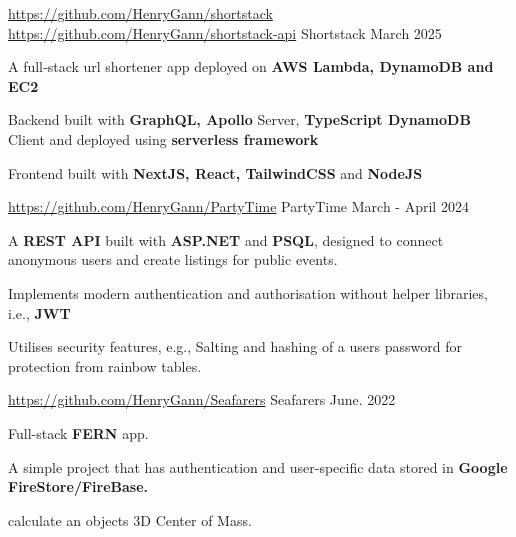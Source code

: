 
\begin{cventries}

  \cventry
  {\href{https://github.com/HenryGann/shortstack}{\faGithub  \space https://github.com/HenryGann/shortstack}  \href{https://github.com/HenryGann/shortstack-api}{\faGithub  \space https://github.com/HenryGann/shortstack-api}} %
  {Shortstack} %
  {} %
  {March 2025} %
  {
    \begin{cvitems} %
      \item{A full‑stack url shortener app deployed on \textbf{AWS Lambda, DynamoDB and EC2}}
      \item{Backend built with \textbf{GraphQL, Apollo} Server, \textbf{TypeScript DynamoDB} Client and deployed using \textbf{serverless framework}}
      \item{Frontend built with \textbf{NextJS, React, TailwindCSS} and \textbf{NodeJS}}
    \end{cvitems}
  }


  \cventry
    {\href{https://github.com/HenryGann/PartyTime}{\faGithub \space https://github.com/HenryGann/PartyTime}}
    {PartyTime}
    {}
    {March - April 2024} %
    {
      \begin{cvitems}
        \item {A \textbf{REST API} built with \textbf{ASP.NET} and \textbf{PSQL}, designed to connect anonymous users and create listings for public events.}
        \item {Implements modern authentication and authorisation without helper libraries, i.e., \textbf{JWT}}
        \item {Utilises security features, e.g., Salting and hashing of a users password for protection from rainbow tables.}
      \end{cvitems}
    }



  \cventry
  {\href{https://github.com/HenryGann/Seafarers}{\faGithub \space https://github.com/HenryGann/Seafarers}} %
  {Seafarers} %
  {} %
  {June. 2022} %
  {
    \begin{cvitems} %
      \item {Full-stack \textbf{FERN} app.}
      \item {A simple project that has authentication and user-specific data stored in \textbf{Google FireStore/FireBase.}}
      \item {calculate an objects 3D Center of Mass.}
    \end{cvitems}
  }

\end{cventries}
